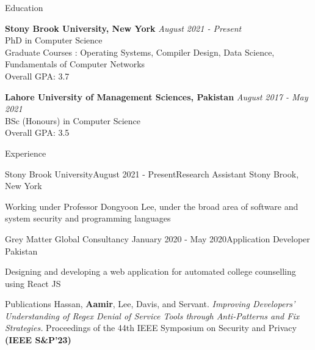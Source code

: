 \documentclass{resume} %
\begin{document}

\begin{rSection}{Education}

{\bf Stony Brook University, New York} \hfill {\em August 2021 - Present } \\ 
PhD in Computer Science \\
Graduate Courses : Operating Systems, Compiler Design, Data Science, Fundamentals of Computer Networks \\
Overall GPA: 3.7

{\bf Lahore University of Management Sciences, Pakistan} \hfill {\em August 2017 - May 2021 } \\ 
BSc (Honours) in Computer Science \\
Overall GPA: 3.5

\end{rSection}


\begin{rSection}{Experience}

\begin{rSubsection}{Stony Brook University}{August 2021 - Present}{Research Assistant }{Stony Brook, New York}
\item Working under Professor Dongyoon Lee, under the broad area of software and system security and programming languages
\end{rSubsection}

\begin{rSubsection}{Grey Matter Global Consultancy }{January 2020 - May 2020}{Application Developer }{Pakistan}
\item Designing and developing a web application for automated college counselling using React JS 
\end{rSubsection}
\end{rSection}
\begin{rSection}{Publications}
Hassan, \textbf{Aamir}, Lee, Davis, and Servant. \emph{Improving Developers’ Understanding of Regex Denial of Service Tools through Anti-Patterns and Fix Strategies.} Proceedings of the 44th IEEE Symposium on Security and Privacy \textbf{(IEEE S\&P'23)}
\end{rSection}
\end{document}
